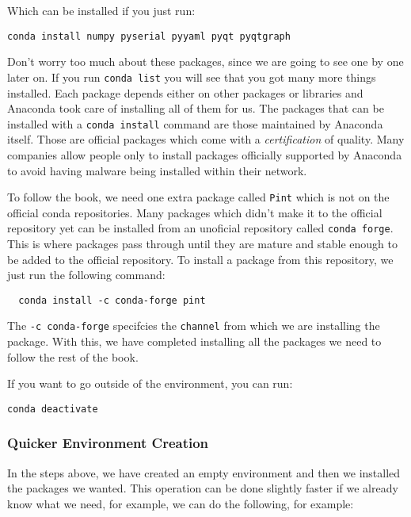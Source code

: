Which can be installed if you just run:

\begin{verbatim}
conda install numpy pyserial pyyaml pyqt pyqtgraph
\end{verbatim}

Don't worry too much about these packages, since we are going to see one by one later on. If you run \texttt{conda list} you will see that you got many more things installed. Each package depends either on other packages or libraries and Anaconda took care of installing all of them for us. The packages that can be installed with a \texttt{conda install} command are those maintained by Anaconda itself. Those are official packages which come with a \emph{certification} of quality. Many companies allow people only to install packages officially supported by Anaconda to avoid having malware being installed within their network.

To follow the book, we need one extra package called \texttt{Pint} which is not on the official conda repositories. Many packages which didn't make it to the official repository yet can be installed from an unoficial repository called \texttt{conda forge}. This is where packages pass through until they are mature and stable enough to be added to the official repository. To install a package from this repository, we just run the following command:

\begin{verbatim}
  conda install -c conda-forge pint
\end{verbatim}

The \texttt{-c conda-forge} specifcies the \texttt{channel} from which we are installing the package. With this, we have completed installing all the packages we need to follow the rest of the book. 

If you want to go outside of the environment, you can run:

\begin{verbatim}
conda deactivate
\end{verbatim}

\subsubsection{Quicker Environment Creation}
In the steps above, we have created an empty environment and then we installed the packages we wanted. This operation can be done slightly faster if we already know what we need, for example, we can do the following, for example:

